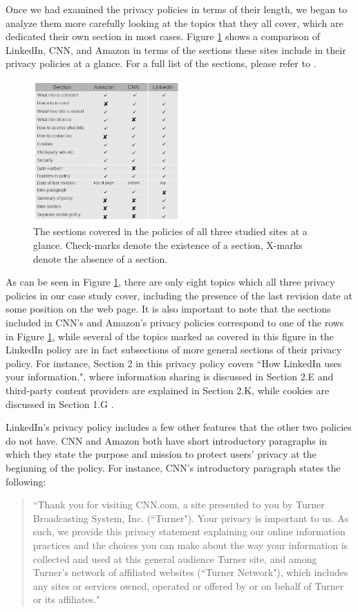 \documentclass{acm_proc_article-sp}
\begin{document}
Once we had examined the privacy policies in terms of their length, we began to analyze them more carefully looking at the topics that they all cover, which are dedicated their own section in most cases. Figure \ref{fig:at-a-glance} shows a comparison of LinkedIn, CNN, and Amazon in terms of the sections these sites include in their privacy policies at a glance. For a full list of the sections, please refer to \cite{amazon,linkedin,cnn}.

\begin{figure} 
\centering
\includegraphics[width=0.5\textwidth]{at-a-glance}
\caption{The sections covered in the policies of all three studied sites at a glance. Check-marks denote the existence of a section, X-marks denote the absence of a section.}
\label{fig:at-a-glance}
\end{figure}

As can be seen in Figure \ref{fig:at-a-glance}, there are only eight topics which all three privacy policies in our case study cover, including the presence of the last revision date at some position on the web page. It is also important to note that the sections included in CNN's and Amazon's privacy policies correspond to one of the rows in Figure \ref{fig:at-a-glance}, while several of the topics marked as covered in this figure in the LinkedIn policy are in fact subsections of more general sections of their privacy policy. For instance, Section 2 in this privacy policy covers ``How LinkedIn uses your information.", where information sharing is discussed in Section 2.E and third-party content providers are explained in Section 2.K, while cookies are discussed in Section 1.G \cite{linkedin}.

LinkedIn's privacy policy includes a few other features that the other two policies do not have. CNN and Amazon both have short introductory paragraphs in which they state the purpose and mission to protect users' privacy at the beginning of the policy. For instance, CNN's introductory paragraph states the following: 
\newpage
\begin{quotation}``Thank you for visiting CNN.com, a site presented to you by Turner Broadcasting System, Inc. (``Turner"). Your privacy is important to us. As such, we provide this privacy statement explaining our online information practices and the choices you can make about the way your information is collected and used at this general audience Turner site, and among Turner's network of affiliated websites (``Turner Network"), which includes any sites or services owned, operated or offered by or on behalf of Turner or its affiliates." \cite{cnn}\end{quotation}
\end{document}

